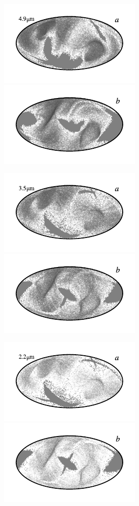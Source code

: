 \documentclass{aa}
\begin{document}
\begin{figure}
	\includegraphics{figs/rms_maps/rms_04a_c0001_000022.pdf}\includegraphics{figs/rms_maps/rms_04b_c0001_000022.pdf}
  \vspace*{-0.85cm}

	\includegraphics{figs/rms_maps/rms_03a_c0001_000022.pdf}\includegraphics{figs/rms_maps/rms_03b_c0001_000022.pdf}
  \vspace*{-0.85cm}

	\includegraphics{figs/rms_maps/rms_02a_c0001_000022.pdf}\includegraphics{figs/rms_maps/rms_02b_c0001_000022.pdf}
  \vspace*{-0.85cm}


\end{figure}
\end{document}

